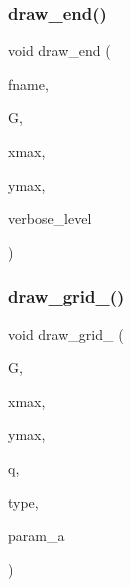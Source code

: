 \subsubsection{\texorpdfstring{draw\+\_\+end()}{draw\_end()}}
{\footnotesize\ttfamily void draw\+\_\+end (\begin{DoxyParamCaption}\item[{char $\ast$}]{fname,  }\item[{\mbox{\hyperlink{classmp__graphics}{mp\+\_\+graphics}} $\ast$}]{G,  }\item[{\mbox{\hyperlink{galois_8h_a09fddde158a3a20bd2dcadb609de11dc}{I\+NT}}}]{xmax,  }\item[{\mbox{\hyperlink{galois_8h_a09fddde158a3a20bd2dcadb609de11dc}{I\+NT}}}]{ymax,  }\item[{\mbox{\hyperlink{galois_8h_a09fddde158a3a20bd2dcadb609de11dc}{I\+NT}}}]{verbose\+\_\+level }\end{DoxyParamCaption})}

\mbox{\label{field_8_c_a7d63b7cbb41f5eee173cf829ac238a23}} 
\subsubsection{\texorpdfstring{draw\+\_\+grid\+\_\+()}{draw\_grid\_()}}
{\footnotesize\ttfamily void draw\+\_\+grid\+\_\+ (\begin{DoxyParamCaption}\item[{\mbox{\hyperlink{classmp__graphics}{mp\+\_\+graphics}} \&}]{G,  }\item[{\mbox{\hyperlink{galois_8h_a09fddde158a3a20bd2dcadb609de11dc}{I\+NT}}}]{xmax,  }\item[{\mbox{\hyperlink{galois_8h_a09fddde158a3a20bd2dcadb609de11dc}{I\+NT}}}]{ymax,  }\item[{\mbox{\hyperlink{galois_8h_a09fddde158a3a20bd2dcadb609de11dc}{I\+NT}}}]{q,  }\item[{\mbox{\hyperlink{galois_8h_a09fddde158a3a20bd2dcadb609de11dc}{I\+NT}}}]{type,  }\item[{\mbox{\hyperlink{galois_8h_a09fddde158a3a20bd2dcadb609de11dc}{I\+NT}}}]{param\+\_\+a }\end{DoxyParamCaption})}

\mbox{\label{field_8_c_a3c04138a5bfe5d72780bb7e82a18e627}} 
